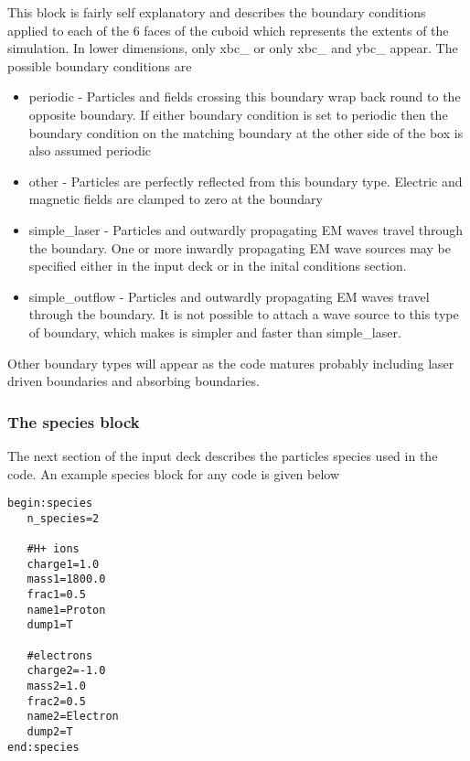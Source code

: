 \documentclass[12pt,a4paper]{article}
\newcommand{\simpleboxverbatim}{\begin{Verbatim}[obeytabs=true,frame=single,
  framerule=0.5mm,rulecolor=\color{warwickmid},formatcom=\color{black}]}
\newcommand{\EPOCH}{{\color{warwickdark}\fontfamily{phv}\selectfont{EPOCH}}}
\begin{document}
This block is fairly self explanatory and describes the boundary conditions
applied to each of the 6 faces of the cuboid which represents the extents of
the simulation. In lower dimensions, only xbc\_ or only xbc\_ and ybc\_
appear. The possible boundary conditions are\\
\begin{itemize}
\item periodic - Particles and fields crossing this boundary wrap back round
  to the opposite boundary. If either boundary condition is set to periodic
  then the boundary condition on the matching boundary at the other side of
  the box is also assumed periodic
\item other - Particles are perfectly reflected from this boundary
  type. Electric and magnetic fields are clamped to zero at the boundary
\item simple\_laser - Particles and outwardly propagating EM waves travel
  through the boundary. One or more inwardly propagating EM wave sources may
  be specified either in the input deck or in the inital conditions section.
\item simple\_outflow - Particles and outwardly propagating EM waves travel
  through the boundary. It is not possible to attach a wave source to this
  type of boundary, which makes is simpler and faster than simple\_laser.
\end{itemize}
Other boundary types will appear as the code matures probably including laser
driven boundaries and absorbing boundaries.\\

\subsubsection{The species block}
The next section of the input deck describes the particles species used in the
code. An example species block for any {\EPOCH} code is given below\\
\simpleboxverbatim
begin:species
   n_species=2

   #H+ ions
   charge1=1.0
   mass1=1800.0
   frac1=0.5
   name1=Proton
   dump1=T

   #electrons
   charge2=-1.0
   mass2=1.0
   frac2=0.5
   name2=Electron
   dump2=T
end:species
\end{Verbatim}
\end{document}
